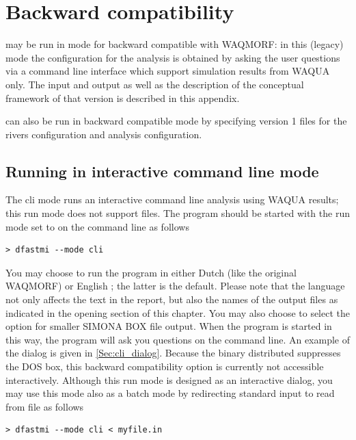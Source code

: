 \chapter{Backward compatibility} \label{Chp:backward}

\dfastmi may be run in  mode for backward compatible with WAQMORF: in this (legacy) mode the configuration for the analysis is obtained by asking the user questions via a command line interface which support simulation results from WAQUA only.
The input and output as well as the description of the conceptual framework of that version is described in this appendix.

\dfastmi can also be run in backward compatible  mode by specifying version 1 files for the rivers configuration and analysis configuration.

\section{Running in interactive command line mode}

The cli mode runs an interactive command line analysis using WAQUA results; this run mode does not support \dflowfm files.
The program should be started with the run mode set to  on the command line as follows

\begin{Verbatim}
> dfastmi --mode cli
\end{Verbatim}

You may choose to run the program in either Dutch  (like the original WAQMORF) or English ; the latter is the default.
Please note that the language not only affects the text in the report, but also the names of the output files as indicated in the opening section of this chapter.
You may also choose to select the  option for smaller SIMONA BOX file output.
When the program is started in this way, the program will ask you questions on the command line.
An example of the dialog is given in \autoref{Sec:cli_dialog}.
Because the \dfmi binary distributed suppresses the DOS box, this backward compatibility option is currently not accessible interactively.
Although this run mode is designed as an interactive dialog, you may use this mode also as a batch mode by redirecting standard input to read from file as follows

\begin{Verbatim}
> dfastmi --mode cli < myfile.in
\end{Verbatim}

